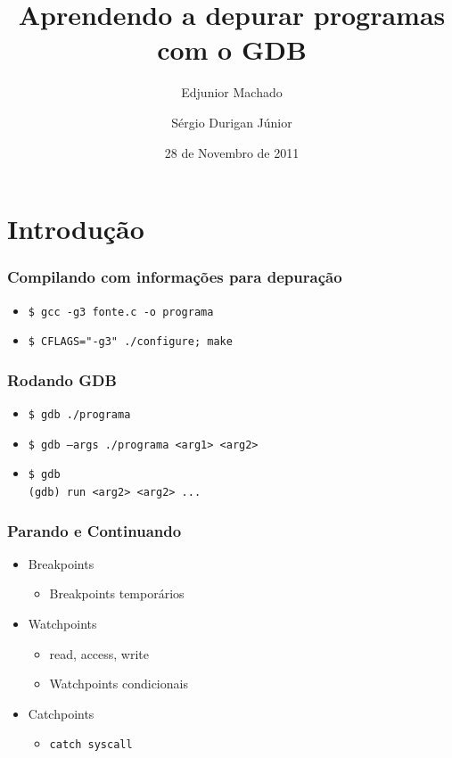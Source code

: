\documentclass[xcolor=pdftex,dvipsnames,table,t]{beamer}
\title{Aprendendo a depurar programas com o GDB}
\author{Edjunior Machado \and
	Sérgio Durigan Júnior}
\date[Unicamp]{28 de Novembro de 2011}
\begin{document}

\section{Introdução}
\begin{frame}
	\frametitle{Compilando com informações para depuração}
	  \begin{itemize}
	    \item \texttt{\$ gcc -g3 fonte.c -o programa}
	    \item \texttt{\$ CFLAGS="-g3" ./configure; make}
	  \end{itemize}
\end{frame}

\begin{frame}
	\frametitle{Rodando GDB}
	  \begin{itemize}
	    \item \texttt{\$ gdb ./programa}
	    \item \texttt{\$ gdb --args ./programa <arg1> <arg2>}
	    \item \texttt{\$ gdb \\
		(gdb) run <arg2> <arg2> ...}
	  \end{itemize}
\end{frame}

\begin{frame}
	\frametitle{Parando e Continuando} %
	  \begin{itemize}
	    \item Breakpoints
	      \begin{itemize}
		\item Breakpoints temporários
	      \end{itemize}
	    \item Watchpoints
	      \begin{itemize}
		\item read, access, write
		\item Watchpoints condicionais
	      \end{itemize}
	    \item Catchpoints
	      \begin{itemize}
		\item \texttt{catch syscall}
	      \end{itemize}
	  \end{itemize}
\end{frame}
\end{document}
